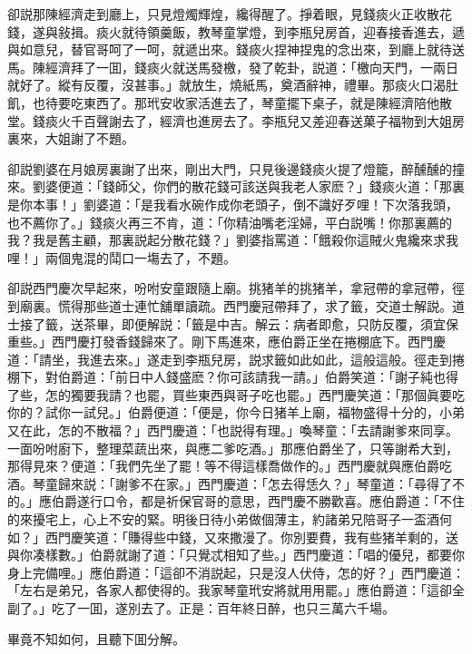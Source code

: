 卻説那陳經濟走到廳上，只見燈燭輝煌，纔得醒了。掙着眼，見錢痰火正收散花錢，遂與敍揖。痰火就待領羹飯，教琴童掌燈，到李瓶兒房首，迎春接香進去，遞與如意兒，替官哥呵了一呵，就遞出來。錢痰火捏神捏鬼的念出來，到廳上就待送馬。陳經濟拜了一囬，錢痰火就送馬發檄，發了乾卦，説道：「檄向天門，一兩日就好了。縱有反覆，沒甚事。」就放生，燒紙馬，奠酒辭神，禮畢。那痰火口渴肚飢，也待要吃東西了。那玳安收家活進去了，琴童擺下桌子，就是陳經濟陪他散堂。錢痰火千百聲謝去了，經濟也進房去了。李瓶兒又差迎春送菓子福物到大姐房裏來，大姐謝了不題。

卻説劉婆在月娘房裏謝了出來，剛出大門，只見後邊錢痰火提了燈籠，醉醺醺的撞來。劉婆便道：「錢師父，你們的散花錢可該送與我老人家麽？」錢痰火道：「那裏是你本事！」劉婆道：「是我看水碗作成你老頭子，倒不識好歹哩！下次落我頭，也不薦你了。」錢痰火再三不肯，道：「你精油嘴老淫婦，平白説嘴！你那裏薦的我？我是舊主顧，那裏説起分散花錢？」劉婆指罵道：「餓殺你這賊火鬼纔來求我哩！」兩個鬼混的鬦口一塲去了，不題。

卻説西門慶次早起來，吩咐安童跟隨上廟。挑猪羊的挑猪羊，拿冠帶的拿冠帶，徑到廟裏。慌得那些道士連忙舖單讀疏。西門慶冠帶拜了，求了籤，交道士解説。道士接了籤，送茶畢，即便解説：「籤是中吉。解云：病者即愈，只防反覆，須宜保重些。」西門慶打發香錢歸來了。剛下馬進來，應伯爵正坐在捲棚底下。西門慶道：「請坐，我進去來。」遂走到李瓶兒房，説求籤如此如此，這般這般。徑走到捲棚下，對伯爵道：「前日中人錢盛麽？你可該請我一請。」伯爵笑道：「謝子純也得了些，怎的獨要我請？也罷，買些東西與哥子吃也罷。」西門慶笑道：「那個眞要吃你的？試你一試兒。」伯爵便道：「便是，你今日猪羊上廟，福物盛得十分的，小弟又在此，怎的不散福？」西門慶道：「也説得有理。」喚琴童：「去請謝爹來同享。一面吩咐廚下，整理菜蔬出來，與應二爹吃酒。」那應伯爵坐了，只等謝希大到，那得見來？便道：「我們先坐了罷！等不得這樣喬做作的。」西門慶就與應伯爵吃酒。琴童歸來説：「謝爹不在家。」西門慶道：「怎去得恁久？」琴童道：「尋得了不的。」應伯爵遂行口令，都是祈保官哥的意思，西門慶不勝歡喜。應伯爵道：「不住的來擾宅上，心上不安的緊。明後日待小弟做個薄主，約諸弟兄陪哥子一盃酒何如？」西門慶笑道：「賺得些中錢，又來撒漫了。你別要費，我有些猪羊剩的，送與你凑樣數。」伯爵就謝了道：「只覺忒相知了些。」西門慶道：「唱的優兒，都要你身上完備哩。」應伯爵道：「這卻不消説起，只是沒人伏侍，怎的好？」西門慶道：「左右是弟兄，各家人都使得的。我家琴童玳安將就用用罷。」應伯爵道：「這卻全副了。」吃了一囬，遂別去了。正是：百年終日醉，也只三萬六千場。

畢竟不知如何，且聽下囬分解。

